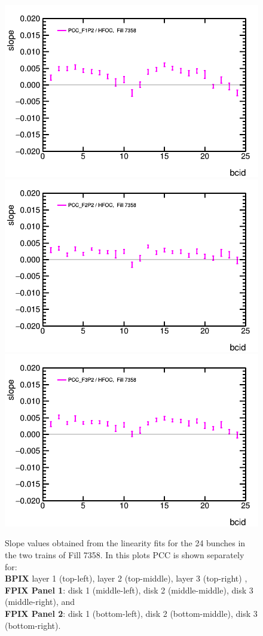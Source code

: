 \begin{figure}[t]
\begin{center}
    \includegraphics[width=0.32\linewidth]{plots/sbilratios_trains_Fill7358/plot_det_linearity_perbx_slope_7358_F1p2.png}
    \includegraphics[width=0.32\linewidth]{plots/sbilratios_trains_Fill7358/plot_det_linearity_perbx_slope_7358_F2p2.png}
    \includegraphics[width=0.32\linewidth]{plots/sbilratios_trains_Fill7358/plot_det_linearity_perbx_slope_7358_F3p2.png}
    \caption{
      Slope values obtained from the linearity fits for the 24 bunches in the two trains of Fill 7358.
      In this plots PCC is shown separately for: \\
      {\bf BPIX} layer 1 (top-left), layer 2 (top-middle), layer 3 (top-right) , \\
      {\bf FPIX Panel 1}:  disk 1 (middle-left), disk 2 (middle-middle), disk 3 (middle-right), and \\
      {\bf FPIX Panel 2}: disk 1 (bottom-left), disk 2 (bottom-middle), disk 3 (bottom-right).
      \label{fig:fill7358trainslope_pccparts}
    }
  \end{center}
\end{figure}
